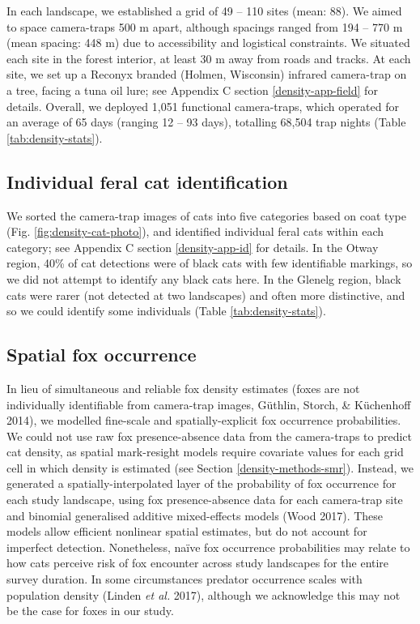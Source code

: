 \documentclass[11pt,a4paper,titlepage,twoside,openright]{style/unimelbthesis}
\begin{document}
\begin{mainmatter}
In each landscape, we established a grid of 49 -- 110 sites (mean: 88). We aimed to space camera-traps 500 m apart, although spacings ranged from 194 -- 770 m (mean spacing: 448 m) due to accessibility and logistical constraints. We situated each site in the forest interior, at least 30 m away from roads and tracks. At each site, we set up a Reconyx branded (Holmen, Wisconsin) infrared camera-trap on a tree, facing a tuna oil lure; see Appendix C section \ref{density-app-field} for details. Overall, we deployed 1,051 functional camera-traps, which operated for an average of 65 days (ranging 12 -- 93 days), totalling 68,504 trap nights (Table \ref{tab:density-stats}).

\hypertarget{individual-feral-cat-identification}{%
\subsection{Individual feral cat identification}\label{individual-feral-cat-identification}}

We sorted the camera-trap images of cats into five categories based on coat type (Fig. \ref{fig:density-cat-photo}), and identified individual feral cats within each category; see Appendix C section \ref{density-app-id} for details. In the Otway region, 40\% of cat detections were of black cats with few identifiable markings, so we did not attempt to identify any black cats here. In the Glenelg region, black cats were rarer (not detected at two landscapes) and often more distinctive, and so we could identify some individuals (Table \ref{tab:density-stats}).

\hypertarget{density-methods-fox}{%
\subsection{Spatial fox occurrence}\label{density-methods-fox}}

In lieu of simultaneous and reliable fox density estimates (foxes are not individually identifiable from camera-trap images, Güthlin, Storch, \& Küchenhoff 2014), we modelled fine-scale and spatially-explicit fox occurrence probabilities. We could not use raw fox presence-absence data from the camera-traps to predict cat density, as spatial mark-resight models require covariate values for each grid cell in which density is estimated (see Section \ref{density-methods-smr}). Instead, we generated a spatially-interpolated layer of the probability of fox occurrence for each study landscape, using fox presence-absence data for each camera-trap site and binomial generalised additive mixed-effects models (Wood 2017). These models allow efficient nonlinear spatial estimates, but do not account for imperfect detection. Nonetheless, naïve fox occurrence probabilities may relate to how cats perceive risk of fox encounter across study landscapes for the entire survey duration. In some circumstances predator occurrence scales with population density (Linden \emph{et al.} 2017), although we acknowledge this may not be the case for foxes in our study.


\end{mainmatter}
\end{document}

